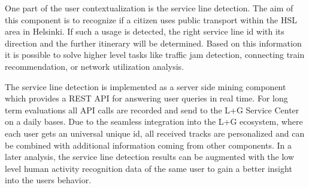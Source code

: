 \documentclass[external]{20120615_deliverable_template_ukob}
\theoremstyle{definition}
\begin{document}
One part of the user contextualization is the service line detection. The aim of this component is to recognize if a citizen uses public transport within the HSL area in Helsinki. If such a usage is detected, the right service line id with its direction and the further itinerary will be determined. Based on this information it is possible to solve higher level tasks like traffic jam detection, connecting train recommendation, or network utilization analysis.

The service line detection is implemented as a server side mining component which provides a REST API for answering user queries in real time. For long term evaluations all API calls are recorded and send to the L+G Service Center on a daily bases. Due to the seamless integration into the L+G ecosystem, where each user gets an universal unique id, all received tracks are personalized and can be combined with additional information coming from other components. In a later analysis, the service line detection results can be augmented with the low level human activity recognition data of the same user to gain a better insight into the users behavior.
\end{document}
